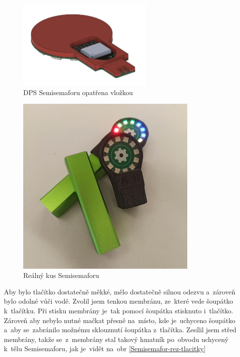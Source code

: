 \begin{figure}[!h]
  \centering
  \includegraphics[width=0.6\textwidth]{text/PraktickaCast/img/Semisemafor-vlozka.png}
  \caption{DPS Semisemaforu opatřena vložkou}
  \label{Semisemafor-vlozka}
\end{figure}

\begin{figure}[!h]
  \centering
  \includegraphics[width=0.8\textwidth]{text/PraktickaCast/img/Real-Semisemafor.jpg}
  \caption{Reálný kus Semisemaforu}
  \label{Semisemafor-real}
\end{figure}

Aby bylo tlačítko dostatečně měkké, mělo dostatečně silnou odezvu a~zároveň bylo odolné vůči vodě.
Zvolil jsem tenkou membránu, ze~které vede šoupátko k~tlačítku.
Při stisku membrány je~tak pomocí šoupátka stisknuto i~tlačítko.
Zároveň aby nebylo nutné mačkat přesně na~místo, kde je~uchyceno šoupátko a~aby se~zabránilo možnému sklouznutí šoupátka z~tlačítka.
Zesílil jsem střed membrány, takže se~z~membrány stal takový hmatník po~obvodu uchycený k~tělu Semisemaforu, jak je~vidět na~obr \ref{Semisemafor-rez-tlacitky}

